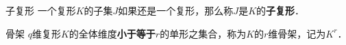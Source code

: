\begin{definition}{子复形}
一个复形$K$的子集$J$如果还是一个复形，那么称$J$是$K$的\textbf{子复形}．
\end{definition}

\begin{definition}{骨架}
$q$维复形$K$的全体维度\textbf{小于等于}$r$的单形之集合，称为$K$的$r$维骨架，记为$K^r$．
\end{definition}










